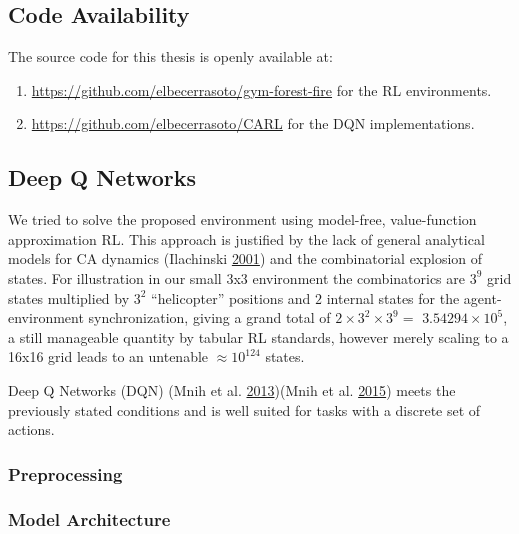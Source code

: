 \documentclass[
]{book}
\providecommand{\tightlist}{%
  \setlength{\itemsep}{0pt}\setlength{\parskip}{0pt}}
\begin{document}
\hypertarget{code-availability}{%
\subsection{Code Availability}\label{code-availability}}

The source code for this thesis is openly available at:

\begin{enumerate}
\def\labelenumi{\arabic{enumi}.}
\tightlist
\item
  \url{https://github.com/elbecerrasoto/gym-forest-fire} for the RL environments.
\item
  \url{https://github.com/elbecerrasoto/CARL} for the DQN implementations.
\end{enumerate}

\hypertarget{deep-q-networks}{%
\subsection{Deep Q Networks}\label{deep-q-networks}}

We tried to solve the proposed environment using model-free, value-function approximation RL. This approach is justified by the lack of general analytical models for CA dynamics (Ilachinski \protect\hyperlink{ref-ilachinski2001cellular}{2001}) and the combinatorial explosion of states. For illustration in our small 3x3 environment the combinatorics are \(3^9\) grid states multiplied by \(3^2\) ``helicopter'' positions and \(2\) internal states for the agent-environment synchronization, giving a grand total of \(2 \times 3^2 \times 3^9 =\) \ensuremath{3.54294\times 10^{5}}, a still manageable quantity by tabular RL standards, however merely scaling to a 16x16 grid leads to an untenable \(\approx 10^{124}\) states.

Deep Q Networks (DQN) (Mnih et al. \protect\hyperlink{ref-mnih2013playing}{2013})(Mnih et al. \protect\hyperlink{ref-mnih2015human}{2015}) meets the previously stated conditions and is well suited for tasks with a discrete set of actions.

\hypertarget{preprocessing}{%
\subsubsection{Preprocessing}\label{preprocessing}}

\hypertarget{model-architecture}{%
\subsubsection{Model Architecture}\label{model-architecture}}
\end{document}
